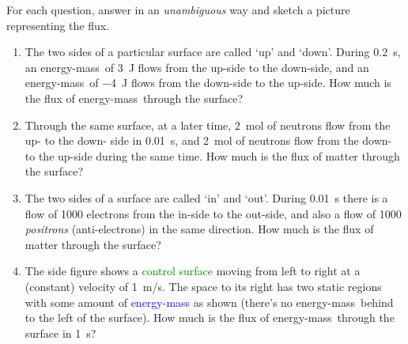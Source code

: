 \documentclass[a4paper,12pt,%
onecolumn,oneside,%
british%
]{memoir}
\renewcommand*{\|}[1][]{\nonscript\:#1\vert\nonscript\:\mathopen{}}
\newcommand*{\energym}{energy-mass}
\begin{document}
\begin{exercise}
    For each question, answer in an \emph{unambiguous} way and sketch a picture representing the flux.
  \begin{enumerate}[exerc]
  \item The two sides of a particular surface are called \enquote*{up} and \enquote*{down}. During \qty{0.2}{s}, an \energym\ of \qty{+3}{J} flows from the up-side to the down-side, and an \energym\ of \qty{-4}{J} flows from the down-side to the up-side. How much is the flux of \energym\ through the surface?
  \item Through the same surface, at a later time, \qty{2}{mol} of neutrons flow from the up- to the down- side in \qty{0.01}{s}, and \qty{2}{mol} of neutrons flow from the down- to the up-side during the same time. How much is the flux of matter through the surface?
  \item The two sides of a surface are called \enquote*{in} and \enquote*{out}. During \qty{0.01}{s} there is a flow of \num{1000} electrons from the in-side to the out-side, and also a flow of \num{1000} \emph{positrons} (anti-electrons) in the same direction. How much is the flux of matter through the surface?
  \item The side figure shows a \textcolor{green}{control surface} moving from left to right at a (constant) velocity of \qty{1}{m/s}. The space to its right has two static regions with some amount of \textcolor{blue}{\energym} as shown (there's no \energym\ behind to the left of the surface). How much is the flux of \energym\ through the surface in \qty{1}{s}?
  \end{enumerate}
\end{exercise}
%
%
\end{document}
